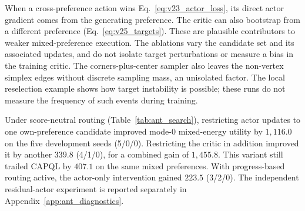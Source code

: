 When a cross-preference action wins Eq.~\eqref{eq:v23_actor_loss}, its
direct actor gradient comes from the generating preference. The critic
can also bootstrap from a different preference (Eq.~\eqref{eq:v25_targets}).
These are plausible contributors to weaker mixed-preference execution.
The ablations vary the candidate set and its associated updates, and
do not isolate target perturbations or measure a bias in the training
critic. The corners-plus-center sampler also leaves the non-vertex
simplex edges without discrete sampling mass, an unisolated factor.
The local reselection example shows how target instability is possible;
these runs do not measure the frequency of such events during training.

Under score-neutral routing (Table~\ref{tab:ant_search}), restricting actor updates to one
own-preference candidate improved mode-0 mixed-energy utility by $1{,}116.0$
on the five development seeds (5/0/0). Restricting the critic in addition
improved it by another $339.8$ (4/1/0), for a combined gain of $1{,}455.8$.
This variant still trailed CAPQL by $407.1$ on the same mixed preferences.
With progress-based routing active, the actor-only intervention gained
$223.5$ (3/2/0). The independent residual-actor experiment is reported
separately in Appendix~\ref{app:ant_diagnostics}.


\FloatBarrier


